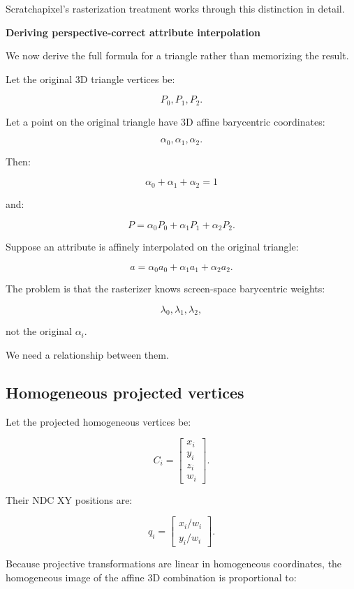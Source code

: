 Scratchapixel's rasterization treatment works through this distinction in detail. 

\textbf{Deriving perspective-correct attribute interpolation}

We now derive the full formula for a triangle rather than memorizing the result.

Let the original 3D triangle vertices be:

\[
 P_0,P_1,P_2.
\]

Let a point on the original triangle have 3D affine barycentric coordinates:

\[
 \alpha_0,\alpha_1,\alpha_2.
\]

Then:

\[
 \boxed{ \alpha_0+\alpha_1+\alpha_2=1 }
\]

and:

\[
 \boxed{ P=\alpha_0P_0+\alpha_1P_1+\alpha_2P_2 }.
\]

Suppose an attribute is affinely interpolated on the original triangle:

\[
 \boxed{ a=\alpha_0a_0+\alpha_1a_1+\alpha_2a_2 }.
\]

The problem is that the rasterizer knows screen-space barycentric weights:

\[
 \lambda_0,\lambda_1,\lambda_2,
\]

not the original \(\alpha_i\).

We need a relationship between them.

\subsection{Homogeneous projected vertices}\label{02-foundations-ii-ch034-homogeneous-projected-vertices}

Let the projected homogeneous vertices be:

\[
 C_i= \begin{bmatrix} x_i\\y_i\\z_i\\w_i \end{bmatrix}.
\]

Their NDC XY positions are:

\[
 q_i= \begin{bmatrix} x_i/w_i\\ y_i/w_i \end{bmatrix}.
\]

Because projective transformations are linear in homogeneous coordinates, the homogeneous image of the affine 3D combination is proportional to:

